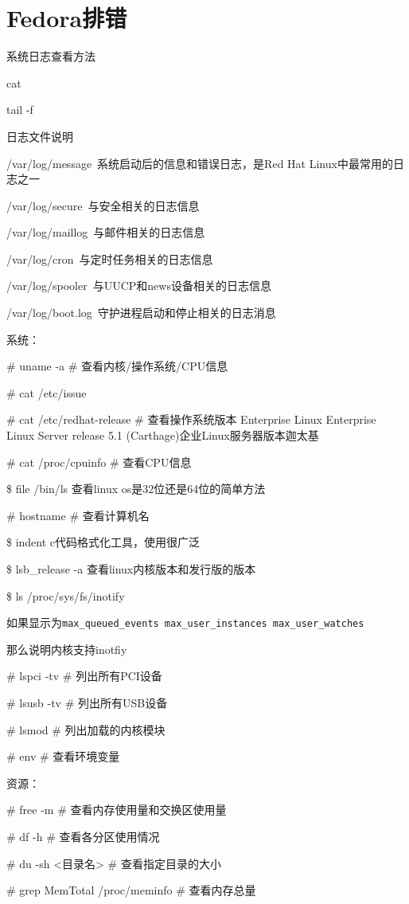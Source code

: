 \chapter{Fedora排错}

系统日志查看方法\cite{fedora_error_check}

cat

tail -f

日志文件说明

/var/log/message~系统启动后的信息和错误日志，是Red Hat Linux中最常用的日志之一

/var/log/secure~与安全相关的日志信息

/var/log/maillog~与邮件相关的日志信息

/var/log/cron~与定时任务相关的日志信息

/var/log/spooler~与UUCP和news设备相关的日志信息

/var/log/boot.log~守护进程启动和停止相关的日志消息

系统：

\# uname -a \# 查看内核/操作系统/CPU信息

\# cat /etc/issue

\# cat /etc/redhat-release \# 查看操作系统版本 Enterprise Linux Enterprise Linux Server release 5.1 (Carthage)企业Linux服务器版本迦太基

\# cat /proc/cpuinfo \# 查看CPU信息

\$ file /bin/ls 查看linux os是32位还是64位的简单方法

\# hostname \# 查看计算机名

\$ indent c代码格式化工具，使用很广泛

\$ lsb\_release -a 查看linux内核版本和发行版的版本

\$ ls /proc/sys/fs/inotify 

如果显示为\verb|max_queued_events max_user_instances max_user_watches|

那么说明内核支持inotfiy

\# lspci -tv \# 列出所有PCI设备

\# lsusb -tv \# 列出所有USB设备

\# lsmod \# 列出加载的内核模块

\# env \# 查看环境变量

资源：

\# free -m \# 查看内存使用量和交换区使用量

\# df -h \# 查看各分区使用情况

\# du -sh <目录名> \# 查看指定目录的大小

\# grep MemTotal /proc/meminfo \# 查看内存总量

